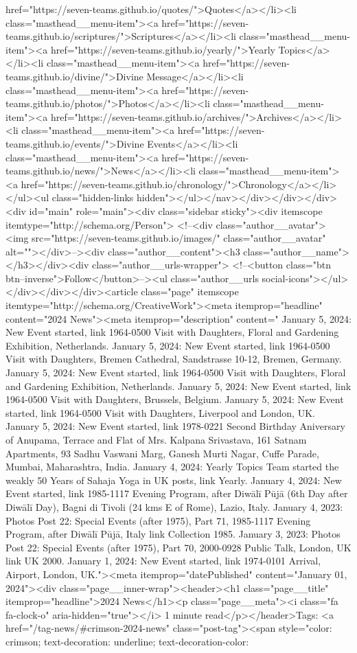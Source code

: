 href="https://seven-teams.github.io/quotes/">Quotes</a></li><li class="masthead__menu-item"><a href="https://seven-teams.github.io/scriptures/">Scriptures</a></li><li class="masthead__menu-item"><a href="https://seven-teams.github.io/yearly/">Yearly Topics</a></li><li class="masthead__menu-item"><a href="https://seven-teams.github.io/divine/">Divine Message</a></li><li class="masthead__menu-item"><a href="https://seven-teams.github.io/photos/">Photos</a></li><li class="masthead__menu-item"><a href="https://seven-teams.github.io/archives/">Archives</a></li><li class="masthead__menu-item"><a href="https://seven-teams.github.io/events/">Divine Events</a></li><li class="masthead__menu-item"><a href="https://seven-teams.github.io/news/">News</a></li><li class="masthead__menu-item"><a href="https://seven-teams.github.io/chronology/">Chronology</a></li></ul><ul class="hidden-links hidden"></ul></nav></div></div></div><div id="main" role="main"><div class="sidebar sticky"><div itemscope itemtype="http://schema.org/Person"> <!--<div class="author__avatar"> <img src="https://seven-teams.github.io/images/" class="author__avatar" alt=""></div>--><div class="author__content"><h3 class="author__name"></h3></div><div class="author__urls-wrapper"> <!--<button class="btn btn--inverse">Follow</button>--><ul class="author__urls social-icons"></ul></div></div></div><article class="page" itemscope itemtype="http://schema.org/CreativeWork"><meta itemprop="headline" content="2024 News"><meta itemprop="description" content=" January 5, 2024: New Event started, link 1964-0500 Visit with Daughters, Floral and Gardening Exhibition, Netherlands. January 5, 2024: New Event started, link 1964-0500 Visit with Daughters, Bremen Cathedral, Sandstrasse 10-12, Bremen, Germany. January 5, 2024: New Event started, link 1964-0500 Visit with Daughters, Floral and Gardening Exhibition, Netherlands. January 5, 2024: New Event started, link 1964-0500 Visit with Daughters, Brussels, Belgium. January 5, 2024: New Event started, link 1964-0500 Visit with Daughters, Liverpool and London, UK. January 5, 2024: New Event started, link 1978-0221 Second Birthday Aniversary of Anupama, Terrace and Flat of Mrs. Kalpana Srivastava, 161 Satnam Apartments, 93 Sadhu Vaswani Marg, Ganesh Murti Nagar, Cuffe Parade, Mumbai, Maharashtra, India. January 4, 2024: Yearly Topics Team started the weakly 50 Years of Sahaja Yoga in UK posts, link Yearly. January 4, 2024: New Event started, link 1985-1117 Evening Program, after Diwālī Pūjā (6th Day after Diwālī Day), Bagni di Tivoli (24 kms E of Rome), Lazio, Italy. January 4, 2023: Photos Post 22: Special Events (after 1975), Part 71, 1985-1117 Evening Program, after Diwālī Pūjā, Italy link Collection 1985. January 3, 2023: Photos Post 22: Special Events (after 1975), Part 70, 2000-0928 Public Talk, London, UK link UK 2000. January 1, 2024: New Event started, link 1974-0101 Arrival, Airport, London, UK."><meta itemprop="datePublished" content="January 01, 2024"><div class="page__inner-wrap"><header><h1 class="page__title" itemprop="headline">2024 News</h1><p class="page__meta"><i class="fa fa-clock-o" aria-hidden="true"></i> 1 minute read</p></header>Tags: <a href="/tag-news/#crimson-2024-news" class="post-tag"><span style="color: crimson; text-decoration: underline; text-decoration-color: 